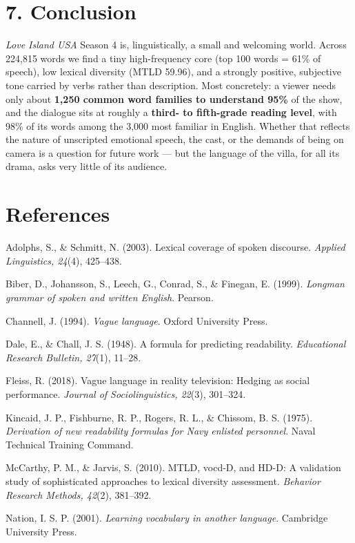 \documentclass[11pt]{article}
\begin{document}
\section*{7. Conclusion}

\emph{Love Island USA} Season 4 is, linguistically, a small and welcoming world. Across 224,815 words we find a tiny high-frequency core (top 100 words = 61\% of speech), low lexical diversity (MTLD 59.96), and a strongly positive, subjective tone carried by verbs rather than description. Most concretely: a viewer needs only about \textbf{1,250 common word families to understand 95\%} of the show, and the dialogue sits at roughly a \textbf{third- to fifth-grade reading level}, with 98\% of its words among the 3,000 most familiar in English. Whether that reflects the nature of unscripted emotional speech, the cast, or the demands of being on camera is a question for future work --- but the language of the villa, for all its drama, asks very little of its audience.


\FloatBarrier
\section*{References}

Adolphs, S., \& Schmitt, N. (2003). Lexical coverage of spoken discourse. \emph{Applied Linguistics, 24}(4), 425--438.

Biber, D., Johansson, S., Leech, G., Conrad, S., \& Finegan, E. (1999). \emph{Longman grammar of spoken and written English}. Pearson.

Channell, J. (1994). \emph{Vague language}. Oxford University Press.

Dale, E., \& Chall, J. S. (1948). A formula for predicting readability. \emph{Educational Research Bulletin, 27}(1), 11--28.

Fleiss, R. (2018). Vague language in reality television: Hedging as social performance. \emph{Journal of Sociolinguistics, 22}(3), 301--324.

Kincaid, J. P., Fishburne, R. P., Rogers, R. L., \& Chissom, B. S. (1975). \emph{Derivation of new readability formulas for Navy enlisted personnel}. Naval Technical Training Command.

McCarthy, P. M., \& Jarvis, S. (2010). MTLD, vocd-D, and HD-D: A validation study of sophisticated approaches to lexical diversity assessment. \emph{Behavior Research Methods, 42}(2), 381--392.

Nation, I. S. P. (2001). \emph{Learning vocabulary in another language}. Cambridge University Press.
\end{document}
